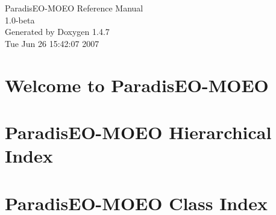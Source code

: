 \documentclass[a4paper]{book}
\begin{document}
\begin{titlepage}
\vspace*{7cm}
\begin{center}
{\Large Paradis\-EO-MOEO Reference Manual\\[1ex]\large 1.0-beta }\\
\vspace*{1cm}
{\large Generated by Doxygen 1.4.7}\\
\vspace*{0.5cm}
{\small Tue Jun 26 15:42:07 2007}\\
\end{center}
\end{titlepage}
\clearemptydoublepage
{}
\tableofcontents
\clearemptydoublepage
{}
\chapter{Welcome to Paradis\-EO-MOEO }
\label{index}
\chapter{Paradis\-EO-MOEO Hierarchical Index}

\chapter{Paradis\-EO-MOEO Class Index}

\end{document}

